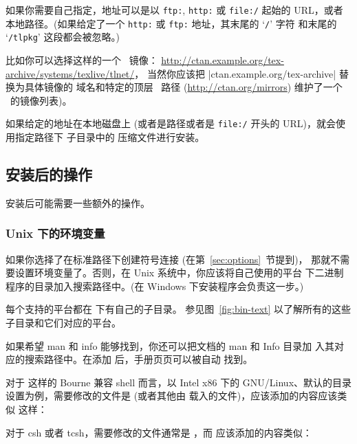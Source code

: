 \documentclass{article}
\begin{document}
如果你需要自己指定，地址可以是以 \texttt{ftp:}, \texttt{http:} 或
\texttt{file:/} 起始的 URL，或者本地路径。(如果给定了一个
\texttt{http:} 或 \texttt{ftp:} 地址，其末尾的 `\texttt{/}' 字符
和末尾的 `\texttt{/tlpkg}' 这段都会被忽略。)

比如你可以选择这样的一个 \CTAN\ 镜像：
\url{http://ctan.example.org/tex-archive/systems/texlive/tlnet/}，
当然你应该把 |ctan.example.org/tex-archive| 替换为具体镜像的
域名和特定的顶层 \CTAN\ 路径 (\url{http://ctan.org/mirrors})
维护了一个 \CTAN\ 的镜像列表)。

如果给定的地址在本地磁盘上 (或者是路径或者是 \texttt{file:/}
开头的 URL)，就会使用指定路径下  子目录中的
压缩文件进行安装。

\subsection{安装后的操作}
\label{sec:postinstall}

安装后可能需要一些额外的操作。

\subsubsection{Unix 下的环境变量}
\label{sec:env}

如果你选择了在标准路径下创建符号连接 (在第~\ref{sec:options}~节提到)，
那就不需要设置环境变量了。否则，在 Unix 系统中，你应该将自己使用的平台
下二进制程序的目录加入搜索路径中。(在 Windows 下安装程序会负责这一步。)

每个支持的平台都在  下有自己的子目录。
参见图~\ref{fig:bin-text} 以了解所有的这些子目录和它们对应的平台。

如果希望 man 和 info 能够找到，你还可以把文档的 man 和 Info 目录加
入其对应的搜索路径中。在添加  后，手册页页可以被自动
找到。

对于  这样的 Bourne 兼容 shell 而言，以 Intel x86 下的
GNU/Linux、默认的目录设置为例，需要修改的文件是 
(或者其他由  载入的文件)，应该添加的内容应该类似
这样：


对于 csh 或者 tcsh，需要修改的文件通常是 ，而
应该添加的内容类似：
\end{document}
